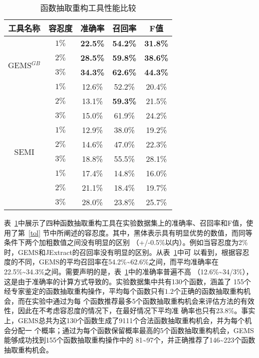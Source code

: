 \begin{table}[!t]
\zihaowu
  \renewcommand{\arraystretch}{1.3}
  \caption{函数抽取重构工具性能比较}
  \label{accuracy}
  \centering
  \begin{tabular}{cc|ccc}
  \toprule
   工具名称 &容忍度 &准确率 &召回率 &F值\\ 
  \midrule
  \multirow{4}{*}{GEMS$^{GB}$}&$1\%$ &\bf{22.5\%} &\bf{54.2\%} &\bf{31.8\%} \\ 
  &$2\%$ &\bf{28.5\%} &\bf{59.8\%} &\bf{38.6\%} \\ 
  &$3\%$ &\bf{34.3\%} &\bf{62.6\%} &\bf{44.3\%} \\ 
  \hline
  \multirow{4}{*}{JExtract}&$1\%$ &12.6\% &52.2\% &20.4\% \\ 
  &$2\%$ &13.1\% &\bf{59.3\%} &21.5\% \\ 
  &$3\%$ &15.0\% &61.9\% &24.2\% \\ 
  \hline
  \multirow{4}{*}{SEMI}&$1\%$ &12.9\% &38.0\% &19.2\% \\ 
  &$2\%$ &14.6\% &47.0\% &22.3\% \\ 
  &$3\%$ &18.8\% &55.5\% &28.1\% \\ 
  \hline
  \multirow{4}{*}{JDeodorant}&$1\%$ &17.4\% &14.8\% &16.0\% \\
  &$2\%$ &21.1\% &18.4\% &19.7\% \\ 
  &$3\%$ &28.0\% &23.8\% &25.7\% \\ 
  \bottomrule
  \end{tabular}
  \end{table}

表~\ref{accuracy}中展示了四种函数抽取重构工具在实验数据集上的准确率、召回率和F值，使用了第~\ref{tol}
节中所阐述的容忍度。其中，黑体表示具有明显优势的数值，而同等条件下两个加粗数值之间没有明显的区别
（+/-0.5\%以内）。例如当容忍度为2\%时，GEMS和JExtract的召回率没有明显的区别。从表~\ref{accuracy}中可
以看到，根据容忍度的不同，GEMS的平均召回率在54.2\%\textasciitilde62.6\%之间，而平均准确率在
22.5\%\textasciitilde 34.3\%之间。需要声明的是，表~\ref{accuracy}中的准确率普遍不高
（12.6\%\textasciitilde34/3\%），这是由于准确率的计算方式导致的。实验数据集中共有130个函数，涵盖了
155个经专家鉴定的函数抽取重构操作，平均每个函数只有$1.2$个正确的函数抽取重构机会，而在实验中通过为每
个函数推荐最多5个函数抽取重构机会来评估方法的有效性，因此在不考虑容忍度的情况下，在最好情况下平均准
确率也只有23.8\%。事实上，GEMS总共为这130个函数生成了9111个合法函数抽取重构机会，并为每个机会分配一
个概率；通过为每个函数保留概率最高的5个函数抽取重构机会，GEMS能够成功找到155个函数抽取重构操作中的
81\textasciitilde97个，并正确推荐了146\textasciitilde223个函数抽取重构机会。

